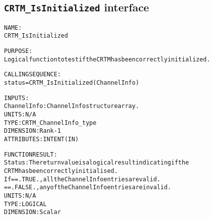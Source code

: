 \subsection{\texttt{CRTM\_IsInitialized} interface}
  \label{sec:CRTM_IsInitialized_interface}
  \begin{alltt}
 
  NAME:
        CRTM_IsInitialized
 
  PURPOSE:
        Logical function to test if the CRTM has been correctly initialized.
 
  CALLING SEQUENCE:
        status = CRTM_IsInitialized( ChannelInfo )
 
  INPUTS:
        ChannelInfo:  ChannelInfo structure array.
                      UNITS:      N/A
                      TYPE:       CRTM_ChannelInfo_type
                      DIMENSION:  Rank-1
                      ATTRIBUTES: INTENT(IN)
 
  FUNCTION RESULT:
        Status:       The return value is a logical result indicating if the
                      CRTM has been correctly initialised.
                      If == .TRUE., all the ChannelInfo entries are valid.
                         == .FALSE., any of the ChannelInfo entries are invalid.
                      UNITS:      N/A
                      TYPE:       LOGICAL
                      DIMENSION:  Scalar
 
  \end{alltt}
